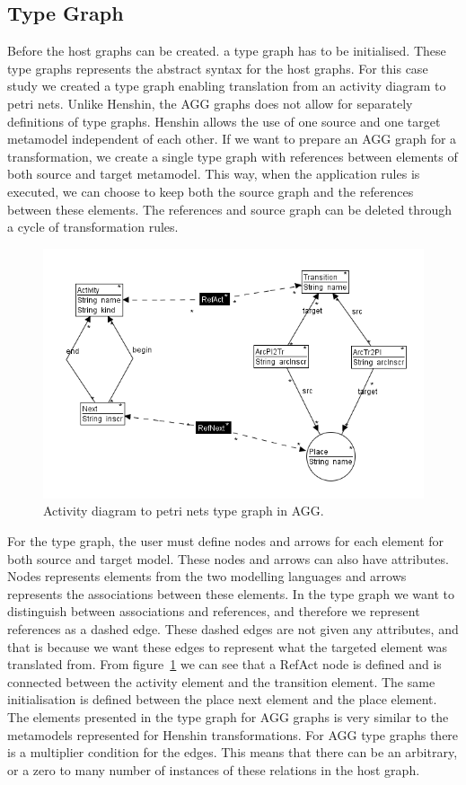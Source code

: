 \documentclass[pdftex,11pt,a4paper]{article}
\begin{document}
\subsection{Type Graph}

\noindent Before the host graphs can be created. a type graph has to be
initialised. These type graphs represents the abstract syntax for the host
graphs. For this case study we created a type graph enabling translation from
an activity diagram to petri nets. Unlike Henshin, the AGG graphs does not
allow for separately definitions of type graphs. Henshin allows the use of one
source and one target metamodel independent of each other. If we want to
prepare an AGG graph for a transformation, we create a single type graph with
references between elements of both source and target metamodel. This way, when
the application rules is executed, we can choose to keep both the source graph
and the references between these elements. The references and source graph can
be deleted through a cycle of transformation rules.

\begin{figure}[H]
	\centering
	\includegraphics[scale=0.7]{figures/AggTypeGraph.png}
	\caption{Activity diagram to petri nets type graph in AGG.}
	\label{fig:AggTypeGraph}
\end{figure}

\indent For the type graph, the user must define nodes and arrows for each
element for both source and target model. These nodes and arrows can also have
attributes. Nodes represents elements from the two modelling languages and
arrows represents the associations between these elements. In the type graph we
want to distinguish between associations and references, and therefore we
represent references as a dashed edge. These dashed edges are not given any
attributes, and that is because we want these edges to represent what the
targeted element was translated from. From figure~\ref{fig:AggTypeGraph} we can
see that a RefAct node is defined and is connected between the activity
element and the transition element. The same initialisation is defined between
the place next element and the place element. The elements presented in the
type graph for AGG graphs is very similar to the metamodels represented for
Henshin transformations. For AGG type graphs there is a multiplier condition for
the edges. This means that there can be an arbitrary, or a zero to many number of
instances of these relations in the host graph.
\end{document}
